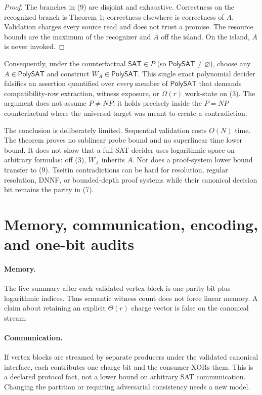 \documentclass[11pt]{article}
\newcommand{\SAT}{\mathsf{SAT}}
\newcommand{\PolySAT}{\mathsf{PolySAT}}
\begin{document}
\begin{proof}
The branches in (9) are disjoint and exhaustive.  Correctness on the recognized branch is Theorem 1; correctness elsewhere is correctness of $A$.  Validation charges every source read and does not trust a promise.  The resource bounds are the maximum of the recognizer and $A$ off the island.  On the island, $A$ is never invoked.
\end{proof}

Consequently, under the counterfactual $\SAT\in P$ (so $\PolySAT\ne\varnothing$), choose any $A\in\PolySAT$ and construct $W_A\in\PolySAT$.  This single exact polynomial decider falsifies an assertion quantified over \emph{every} member of $\PolySAT$ that demands compatibility-row extraction, witness exposure, or $\Omega(r)$ work-state on (3).  The argument does not assume $P\ne NP$; it holds precisely inside the $P=NP$ counterfactual where the universal target was meant to create a contradiction.

The conclusion is deliberately limited.  Sequential validation costs $O(N)$ time.  The theorem proves no sublinear probe bound and no superlinear time lower bound.  It does not show that a full SAT decider uses logarithmic space on arbitrary formulas: off (3), $W_A$ inherits $A$.  Nor does a proof-system lower bound transfer to (9).  Tseitin contradictions can be hard for resolution, regular resolution, DNNF, or bounded-depth proof systems while their canonical decision bit remains the parity in (7).

\section{Memory, communication, encoding, and one-bit audits}

\paragraph{Memory.}
The live summary after each validated vertex block is one parity bit plus logarithmic indices.  Thus semantic witness count does not force linear memory.  A claim about retaining an explicit $\Theta(r)$ charge vector is false on the canonical stream.

\paragraph{Communication.}
If vertex blocks are streamed by separate producers under the validated canonical interface, each contributes one charge bit and the consumer XORs them.  This is a declared protocol fact, not a lower bound on arbitrary SAT communication.  Changing the partition or requiring adversarial consistency needs a new model.
\end{document}
